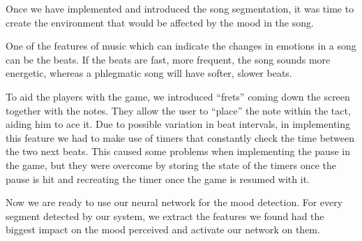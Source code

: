 Once we have implemented and introduced the song segmentation, it was time to create the environment that would be affected by the mood in the song.

One of the features of music which can indicate the changes in emotions in a song can be the beats. If the beats are fast, more frequent, the song sounds more energetic, whereas a phlegmatic song will have softer, slower beats. 

To aid the players with the game, we introduced ``frets'' coming down the screen together with the notes. They allow the user to ``place'' the note within the tact, aiding him to ace it. Due to possible variation in beat intervals, in implementing this feature we had to make use of timers that constantly check the time between the two next beats. This caused some problems when implementing the pause in the game, but they were overcome by storing the state of the timers once the pause is hit and recreating the timer once the game is resumed with it. 

Now we are ready to use our neural network for the mood detection. For every segment detected by our system, we extract the features we found had the biggest impact on the mood perceived and activate our network on them. 

